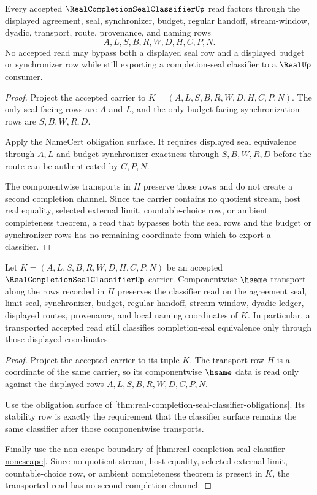 \begin{theorem}
\label{thm:real-completion-seal-classifier-nonescape}
Every accepted $\RealCompletionSealClassifierUp$ read factors through the displayed agreement, seal, synchronizer, budget, regular handoff, stream-window, dyadic, transport, route, provenance, and naming rows
$$
A,L,S,B,R,W,D,H,C,P,N.
$$
No accepted read may bypass both a displayed seal row and a displayed budget or synchronizer row while still exporting a completion-seal classifier to a $\RealUp$ consumer.
\end{theorem}
\begin{proof}
Project the accepted carrier to $K=(A,L,S,B,R,W,D,H,C,P,N)$. The only seal-facing rows are $A$ and $L$, and the only budget-facing synchronization rows are $S,B,W,R,D$.

Apply the NameCert obligation surface. It requires displayed seal equivalence through $A,L$ and budget-synchronizer exactness through $S,B,W,R,D$ before the route can be authenticated by $C,P,N$.

The componentwise transports in $H$ preserve those rows and do not create a second completion channel. Since the carrier contains no quotient stream, host real equality, selected external limit, countable-choice row, or ambient completeness theorem, a read that bypasses both the seal rows and the budget or synchronizer rows has no remaining coordinate from which to export a classifier.
\end{proof}

\begin{theorem}
\label{thm:real-completion-seal-classifier-stability}
Let $K=(A,L,S,B,R,W,D,H,C,P,N)$ be an accepted $\RealCompletionSealClassifierUp$ carrier. Componentwise $\hsame$ transport along the rows recorded in $H$ preserves the classifier read on the agreement seal, limit seal, synchronizer, budget, regular handoff, stream-window, dyadic ledger, displayed routes, provenance, and local naming coordinates of $K$. In particular, a transported accepted read still classifies completion-seal equivalence only through those displayed coordinates.
\end{theorem}
\begin{proof}
Project the accepted carrier to its tuple $K$. The transport row $H$ is a coordinate of the same carrier, so its componentwise $\hsame$ data is read only against the displayed rows $A,L,S,B,R,W,D,C,P,N$.

Use the obligation surface of \autoref{thm:real-completion-seal-classifier-obligations}. Its stability row is exactly the requirement that the classifier surface remains the same classifier after those componentwise transports.

Finally use the non-escape boundary of \autoref{thm:real-completion-seal-classifier-nonescape}. Since no quotient stream, host equality, selected external limit, countable-choice row, or ambient completeness theorem is present in $K$, the transported read has no second completion channel.
\end{proof}

